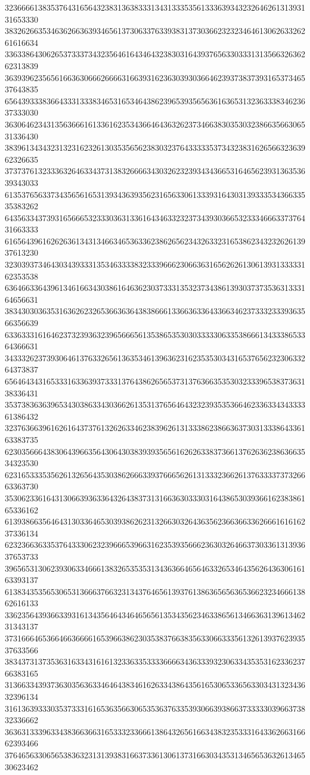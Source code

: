 32366661383537643165643238313638333134313335356133363934323264626131393131653330
38326266353463626636393465613730633763393831373036623232346461306263326261616634
33633864306265373337343235646164346432383031643937656330333131356632636262313839
36393962356561663630666266663166393162363039303664623937383739316537346537643835
65643933383664333133383465316534643862396539356563616365313236333834623637333030
36306462343135636661613361623534366464363262373466383035303238663566306531336430
38396134343231323162326130353565623830323764333335373432383162656632363962326635
37373761323336326463343731383266663430326232393434366531646562393136353639343033
61353765633734356561653139343639356231656330613339316430313933353436633535383262
64356334373931656665323330363133616434633232373439303665323334666337376431663333
61656439616262636134313466346536336238626562343263323165386234323262613937613230
32303937346430343933313534633338323339666230663631656262613061393133333162353538
63646633643961346166343038616463623037333135323734386139303737353631333164656631
38343030363531636262326536636364383866613366363364336634623733323339363566356639
63363331616462373239363239656665613538653530303333306335386661343338653364366631
34333262373930646137633265613635346139636231623535303431653765623230633264373837
65646434316533316336393733313764386265653731376366353530323339653837363138336431
35373836363965343038633430366261353137656464323239353536646233633434333361386432
32376366396162616437376132626334623839626131333862386636373031333864336163383735
62303566643830643966356430643038393935656162626338373661376263623863663534323530
62316533353562613265643530386266633937666562613133323662613763333737326663363730
35306233616431306639363364326438373131663630333031643865303936616238386165336162
61393866356464313033646530393862623132663032643635623663663362666161616237336134
62323663633537643330623239666539663162353935666236303264663730336131393637653733
39656531306239306334666138326535353134363664656463326534643562643630616163393137
61383435356530653136663766323134376465613937613863656563653662323466613862616133
33623564393663393161343564643464656561353435623463386561346636313961346231343137
37316664653664663666616539663862303538376638356330663335613261393762393537633566
38343731373536316334316161323363353333666634363339323063343535316233623766383165
31366334393736303563633464643834616263343864356165306533656330343132343632396134
31613639333035373331616536356630653536376335393066393866373333303966373832336662
36363133396334383663663165333233666138643265616634383235333164336266316662393466
37646563306565383632313139383166373361306137316630343531346565363261346530623462
